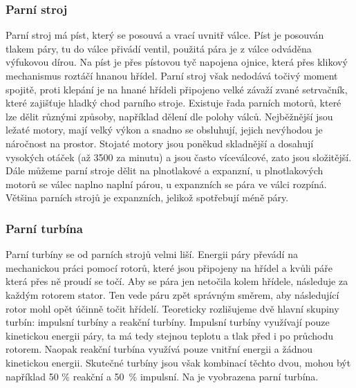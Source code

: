 \subsubsection{Parní stroj}\label{sc:ParniStroj}
{Parní stroj má píst, který se posouvá a vrací uvnitř válce. Píst je posouván tlakem páry, tu do válce přivádí ventil, použitá pára je z válce odváděna výfukovou dírou. Na píst je přes pístovou tyč napojena ojnice, která přes klikový mechanismus roztáčí hnanou hřídel. Parní stroj však nedodává točivý moment spojitě, proti klepání je na hnané hřídeli připojeno velké závaží zvané setrvačník, které zajišťuje hladký chod parního stroje.}
\cite{st:parniStroj}\cite{vutb:parniStroj}\odst
{Existuje řada parních motorů, které lze dělit různými způsoby, například dělení dle polohy válců. Nejběžnější jsou ležaté motory, mají velký výkon a snadno se obsluhují, jejich nevýhodou je náročnost na prostor. Stojaté motory jsou poněkud skladnější a dosahují vysokých otáček (až 3500 za minutu) a jsou často víceválcové, zato jsou složitější. Dále můžeme parní stroje dělit na plnotlakové a expanzní, u plnotlakových motorů se válec naplno naplní párou, u expanzních se pára ve válci rozpíná. Většina parních strojů je expanzních, jelikož spotřebují méně páry.}
\cite{st:parniStroj}\cite{vutb:parniStroj}

\newpage

\subsubsection{Parní turbína}\label{sc:ParniTurbina}
{Parní turbíny se od parních strojů velmi liší. Energii páry převádí na mechanickou práci pomocí rotorů, které jsou připojeny na hřídel a kvůli páře která přes ně proudí se točí. Aby se pára jen netočila kolem hřídele, následuje za každým rotorem stator. Ten vede páru zpět správným směrem, aby následující rotor mohl opět účinně točit hřídelí.}
\cite{LESICS:WorkingOfSteamTurbine}\odst
{Teoreticky rozlišujeme dvě hlavní skupiny turbín: impulsní turbíny a reakční turbíny. Impulsní turbíny využívají pouze kinetickou energii páry, ta má tedy stejnou teplotu a tlak před i po průchodu rotorem. Naopak reakční turbína využívá pouze vnitřní energii a žádnou kinetickou energii. Skutečné turbíny jsou však kombinací těchto dvou, mohou být například 50 \% reakční a 50~\% impulsní. Na  je vyobrazena parní turbína.}
\cite{LESICS:WorkingOfSteamTurbine}

